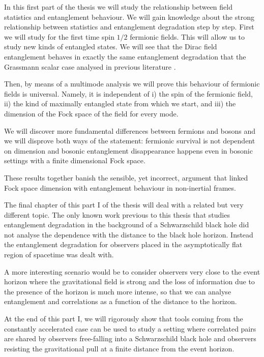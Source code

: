 In this first part of the thesis we will study the relationship between field statistics and entanglement behaviour. We will  gain knowledge about the strong relationship between statistics and entanglement degradation step by step. First we will study for the first time spin $1/2$ fermionic fields. This will allow us to study new kinds of entangled states. We will see  that the Dirac field entanglement behaves in exactly the same entanglement degradation that the Grassmann scalar case analysed in previous literature \cite{AlsingSchul}.

Then, by means of a multimode analysis we will prove this behaviour of fermionic fields is universal. Namely, it is independent of  i) the spin of the fermionic field,  ii) the kind of maximally entangled state from which we start, and iii) the dimension of the Fock space of the field for every mode.

We will discover more fundamental differences between fermions and bosons and we will disprove both ways of the statement: fermionic survival is not dependent on dimension and bosonic entanglement disappearance happens even in bosonic settings with a finite dimensional Fock space.

These results together banish the sensible, yet incorrect, argument that linked Fock space dimension with entanglement behaviour in non-inertial frames.

The final chapter of this part I of the thesis will deal with a related but very different topic. The only known work \cite{schacross} previous to this thesis that studies entanglement degradation in the background of a Schwarzschild black hole did not analyse the dependence with the distance to the black hole horizon. Instead the entanglement degradation for observers placed in the asymptotically flat region of spacetime was dealt with.

A more interesting scenario would be to consider observers very close to the event horizon where the gravitational field is strong and the loss of information due to the presence of the horizon is much more intense, so that we can analyse entanglement and correlations as a function of the distance to the horizon.

At the end of this part I, we will rigorously show that tools coming from the constantly accelerated case can be used to study a setting where correlated pairs are shared by observers free-falling into a Schwarzschild black hole and observers resisting the gravitational pull at a finite distance from the event horizon.


